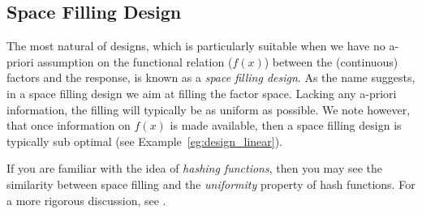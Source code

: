 \subsection{Space Filling Design}
\label{sec:space_filling}
The most natural of designs, which is particularly suitable when we have no a-priori assumption on the functional relation ($f(x)$) between the (continuous) factors and the response, is known as a \emph{space filling design}.
As the name suggests, in a space filling design we aim at filling the factor space. Lacking any a-priori information, the filling will typically be as uniform as possible. 
We note however, that once information on $f(x)$ is made available, then a space filling design is typically sub optimal (see Example~\ref{eg:design_linear}).


\begin{extra}
If you are familiar with the idea of \emph{hashing functions}, then you may see the similarity between space filling and the \emph{uniformity} property of hash functions. 
For a more rigorous discussion, see \cite{hill_first_1986}.
\end{extra}



